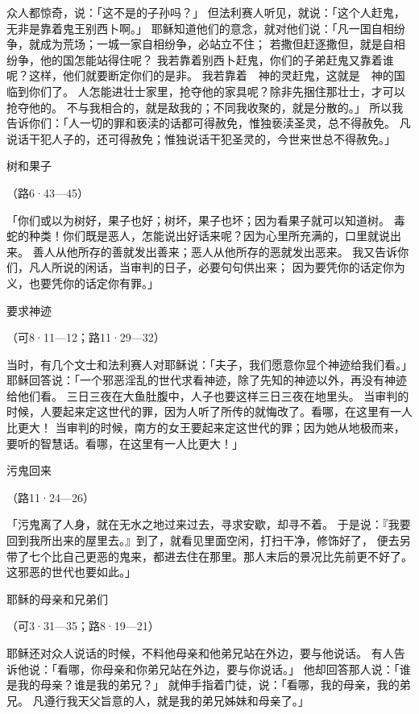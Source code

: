 {众人都惊奇，说：「这不是{}的子孙吗？」
但法利赛人听见，就说：「这个人赶鬼，无非是靠着鬼王别西卜啊。」
耶稣知道他们的意念，就对他们说：「凡一国自相纷争，就成为荒场；一城一家自相纷争，必站立不住；
若撒但赶逐撒但，就是自相纷争，他的国怎能站得住呢？
我若靠着别西卜赶鬼，你们的子弟赶鬼又靠着谁呢？这样，他们就要断定你们的是非。
我若靠着　神的灵赶鬼，这就是　神的国临到你们了。
人怎能进壮士家里，抢夺他的家具呢？除非先捆住那壮士，才可以抢夺他的{}。
不与我相合的，就是敌我的；不同我收聚的，就是分散的。」
所以我告诉你们：「人一切的罪和亵渎的话都可得赦免，惟独亵渎圣灵，总不得赦免。
凡说话干犯人子的，还可得赦免；惟独说话干犯圣灵的，今世来世总不得赦免。」
\par }{\SH 树和果子
\par }{\R （路6·43—45）
\par }{\PP {}「你们或以为树好，果子也好；树坏，果子也坏；因为看果子就可以知道树。
毒蛇的种类！你们既是恶人，怎能说出好话来呢？因为心里所充满的，口里就说出来。
善人从他{}所存的善就发出善来；恶人从他{}所存的恶就发出恶来。
我又告诉你们，凡人所说的闲话，当审判的日子，必要句句供出来；
因为要凭你的话定你为义，也要凭你的话定你有罪。」
\par }{\SH 要求神迹
\par }{\R （可8·11—12；路11·29—32）
\par }{\PP {}当时，有几个文士和法利赛人对耶稣说：「夫子，我们愿意你显个神迹给我们看。」
耶稣回答说：「一个邪恶淫乱的世代求看神迹，除了先知{}的神迹以外，再没有神迹给他们看。
三日三夜在大鱼肚腹中，人子也要这样三日三夜在地里头。
当审判的时候，{}人要起来定这世代的罪，因为{}人听了{}所传的就悔改了。看哪，在这里有一人比{}更大！
当审判的时候，南方的女王要起来定这世代的罪；因为她从地极而来，要听{}的智慧话。看哪，在这里有一人比{}更大！」
\par }{\SH 污鬼回来
\par }{\R （路11·24—26）
\par }{\PP {}「污鬼离了人身，就在无水之地过来过去，寻求安歇{}，却寻不着。
于是说：『我要回到我所出来的屋里去。』到了，就看见里面空闲，打扫干净，修饰好了，
便去另带了七个比自己更恶的鬼来，都进去住在那里。那人末后的景况比先前更不好了。这邪恶的世代也要如此。」
\par }{\SH 耶稣的母亲和兄弟们
\par }{\R （可3·31—35；路8·19—21）
\par }{\PP {}耶稣还对众人说话的时候，不料他母亲和他弟兄站在外边，要与他说话。
有人告诉他说：「看哪，你母亲和你弟兄站在外边，要与你说话。」
他却回答那人说：「谁是我的母亲？谁是我的弟兄？」
就伸手指着门徒，说：「看哪，我的母亲，我的弟兄。
凡遵行我天父旨意的人，就是我的弟兄姊妹和母亲了。」

}
